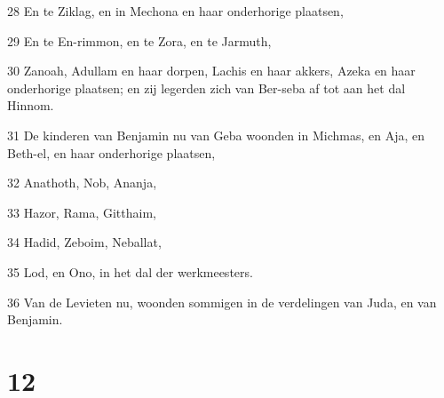 \par 28 En te Ziklag, en in Mechona en haar onderhorige plaatsen,
\par 29 En te En-rimmon, en te Zora, en te Jarmuth,
\par 30 Zanoah, Adullam en haar dorpen, Lachis en haar akkers, Azeka en haar onderhorige plaatsen; en zij legerden zich van Ber-seba af tot aan het dal Hinnom.
\par 31 De kinderen van Benjamin nu van Geba woonden in Michmas, en Aja, en Beth-el, en haar onderhorige plaatsen,
\par 32 Anathoth, Nob, Ananja,
\par 33 Hazor, Rama, Gitthaim,
\par 34 Hadid, Zeboim, Neballat,
\par 35 Lod, en Ono, in het dal der werkmeesters.
\par 36 Van de Levieten nu, woonden sommigen in de verdelingen van Juda, en van Benjamin.

\chapter{12}

